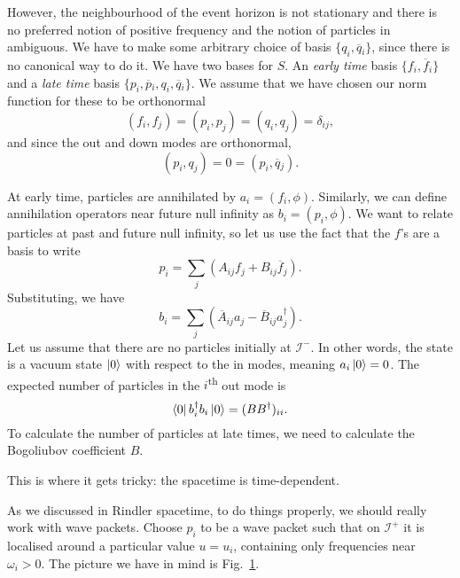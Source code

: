 However, the neighbourhood of the event horizon is not stationary and there is no preferred notion of positive frequency and the notion of particles in ambiguous. We have to make some arbitrary choice of basis $\{q_i, \overline{q}{}_i\}$, since there is no canonical way to do it.
We have two bases for $S$. An \emph{early time} basis $\{f_i, \overline{f}{}_i\}$ and a \emph{late time} basis $\{p_i, \overline{p}{}_i, q_i, \overline{q}{}_i\}$.
We assume that we have chosen our norm function for these to be orthonormal
\begin{equation}
  (f_i, f_j) = (p_i, p_j) = (q_i, q_j) = \delta_{ij},
\end{equation}
and since the out and down modes are orthonormal, 
\begin{equation}
  (p_i, q_j) = 0 = (p_i, \overline{q}{}_j).
\end{equation}

At early time, particles are annihilated by $a_i = (f_i, \phi)$. Similarly, we can define annihilation operators near future null infinity as $b_i = (p_i, \phi)$.
We want to relate particles at past and future null infinity, so let us use the fact that the $f$'s are a basis to write
\begin{equation}
  p_i = \sum_{j} (A_{ij} f_j + B_{ij} \overline{f}{}_j).
\end{equation}
Substituting, we have
\begin{equation}
  b_i = \sum_j (\overline{A}{}_{ij} a_j - \overline{B}{}_{ij} a_j^{\dagger}).
\end{equation}
Let us assume that there are no particles initially at $\mathscr{I}^-$. In other words, the state is a vacuum state $\ket{0}$ with respect to the in modes, meaning $a_i \ket{0} = 0$.
The expected number of particles in the $i$\textsuperscript{th} out mode is
\begin{equation}
  \bra{0} b_i^{\dagger} b_i \ket{0} = (BB^{\dagger})_{ii}.
\end{equation}
To calculate the number of particles at late times, we need to calculate the Bogoliubov coefficient $B$.

This is where it gets tricky: the spacetime is time-dependent.

As we discussed in Rindler spacetime, to do things properly, we should really work with wave packets.
Choose $p_i$ to be a wave packet such that  on $\mathscr{I}^+$ it is localised around a particular value $u = u_i$, containing only frequencies near $\omega_i > 0$.
The picture we have in mind is Fig.~\ref{fig:l22f10}.
\begin{figure}[bthp]
  \centering
  \caption{}
  \label{fig:l22f10}
\end{figure}

